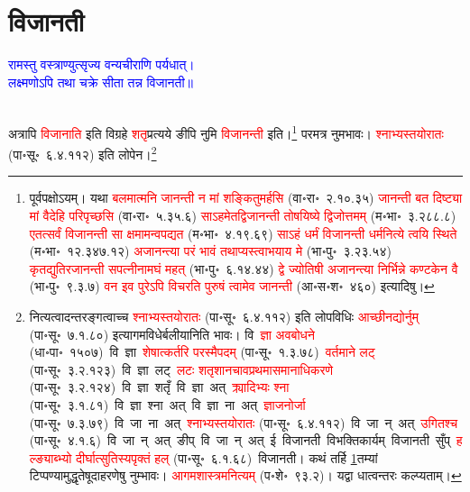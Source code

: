 \section[विजानती]{विजानती}
\centering\textcolor{blue}{रामस्तु वस्त्राण्युत्सृज्य वन्यचीराणि पर्यधात्।\nopagebreak\\
लक्ष्मणोऽपि तथा चक्रे सीता तन्न विजानती॥}\nopagebreak\\
\\
\begin{sloppypar}\justifying\noindent\hspace{10mm} अत्रापि \textcolor{red}{विजानाति} इति विग्रहे \textcolor{red}{शतृ}\-प्रत्यये ङीपि नुमि \textcolor{red}{विजानन्ती} इति।\footnote{\setcounter{dummy}{\value{footnote}}\addtocounter{dummy}{-1}\label{fn:jananti}पूर्वपक्षोऽयम्। यथा \textcolor{red}{बलमात्मनि जानन्ती न मां शङ्कितुमर्हसि} (वा॰रा॰~२.१०.३५) \textcolor{red}{जानन्ती बत दिष्ट्या मां वैदेहि परिपृच्छसि} (वा॰रा॰~५.३५.६) \textcolor{red}{साऽहमेतद्विजानन्ती तोषयिष्ये द्विजोत्तमम्} (म॰भा॰~३.२८८.८) \textcolor{red}{एतत्सर्वं विजानन्ती सा क्षमामन्वपद्यत} (म॰भा॰~४.१९.६९) \textcolor{red}{साऽहं धर्मं विजानन्ती धर्मनित्ये त्वयि स्थिते} (म॰भा॰~१२.३४७.१२) \textcolor{red}{अजानन्त्या परं भावं तथाप्यस्त्वाभयाय मे} (भा॰पु॰~३.२३.५४) \textcolor{red}{कृतद्युतिरजानन्ती सपत्‍नीनामघं महत्} (भा॰पु॰~६.१४.४४) \textcolor{red}{द्वे ज्योतिषी अजानन्त्या निर्भिन्ने कण्टकेन वै} (भा॰पु॰~९.३.७) \textcolor{red}{वन इव पुरेऽपि विचरति पुरुषं त्वामेव जानन्ती} (आ॰स॰श॰~४६०) इत्यादिषु।} परमत्र नुमभावः। \textcolor{red}{श्नाभ्यस्तयोरातः} (पा॰सू॰~६.४.११२) इति लोपेन।\footnote{नित्यत्वादन्त\-रङ्गत्वाच्च \textcolor{red}{श्नाभ्यस्तयोरातः} (पा॰सू॰~६.४.११२) इति लोपविधिः \textcolor{red}{आच्छीनद्योर्नुम्} (पा॰सू॰~७.१.८०) इत्यागम\-विधेर्बलीयानिति भावः। वि~\textcolor{red}{ज्ञा अवबोधने} (धा॰पा॰~१५०७)~\arrow वि~ज्ञा~\arrow \textcolor{red}{शेषात्कर्तरि परस्मैपदम्} (पा॰सू॰~१.३.७८)~\arrow \textcolor{red}{वर्तमाने लट्} (पा॰सू॰~३.२.१२३)~\arrow वि~ज्ञा~लट्~\arrow \textcolor{red}{लटः शतृशानचावप्रथमा\-समानाधिकरणे} (पा॰सू॰~३.२.१२४)~\arrow वि~ज्ञा~शतृँ~\arrow वि~ज्ञा~अत्~\arrow \textcolor{red}{क्र्यादिभ्यः श्ना} (पा॰सू॰~३.१.८१)~\arrow वि~ज्ञा~श्ना~अत्~\arrow वि~ज्ञा~ना~अत्~\arrow \textcolor{red}{ज्ञाजनोर्जा} (पा॰सू॰~७.३.७९)~\arrow वि~जा~ना~अत्~\arrow \textcolor{red}{श्नाभ्यस्तयोरातः} (पा॰सू॰~६.४.११२)~\arrow वि~जा~न्~अत्~\arrow \textcolor{red}{उगितश्च} (पा॰सू॰~४.१.६)~\arrow वि~जा~न्~अत्~ङीप्‌~\arrow वि~जा~न्~अत्~ई~\arrow विजानती~\arrow विभक्तिकार्यम्~\arrow विजानती~सुँप्~\arrow \textcolor{red}{हल्ङ्याब्भ्यो दीर्घात्सुतिस्यपृक्तं हल्} (पा॰सू॰~६.१.६८)~\arrow विजानती। कथं तर्हि \ref{fn:jananti}तम्यां टिप्पण्यामुद्धृतेषूदाहरणेषु नुम्भावः। \textcolor{red}{आगम\-शास्त्रमनित्यम्} (प॰शे॰~९३.२)। यद्वा धात्वन्तरः कल्प्यताम्।}
\end{sloppypar}
